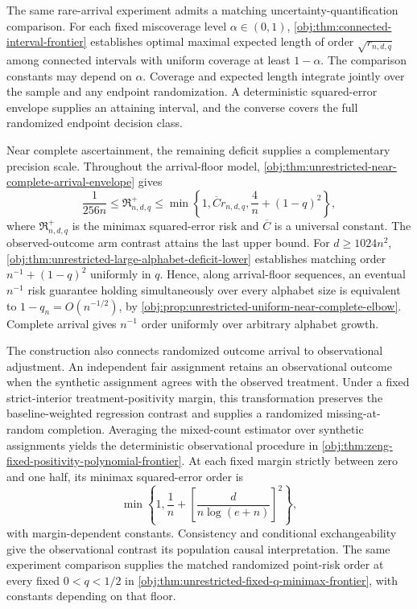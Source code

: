 The same rare-arrival experiment admits a matching uncertainty-quantification comparison. For each fixed miscoverage level \(\alpha\in(0,1)\), \cref{obj:thm:connected-interval-frontier} establishes optimal maximal expected length of order \(\sqrt{r_{n,d,q}}\) among connected intervals with uniform coverage at least \(1-\alpha\). The comparison constants may depend on \(\alpha\). Coverage and expected length integrate jointly over the sample and any endpoint randomization. A deterministic squared-error envelope supplies an attaining interval, and the converse covers the full randomized endpoint decision class.

Near complete ascertainment, the remaining deficit supplies a complementary precision scale. Throughout the arrival-floor model, \cref{obj:thm:unrestricted-near-complete-arrival-envelope} gives
\[
\frac{1}{256n}
\le \mathfrak R^{+}_{n,d,q}
\le
\min\left\{1,\overline C r_{n,d,q},
\frac4n+(1-q)^2\right\},
\]
where \(\mathfrak R^{+}_{n,d,q}\) is the minimax squared-error risk and \(\overline C\) is a universal constant. The observed-outcome arm contrast attains the last upper bound. For \(d\ge1024n^2\), \cref{obj:thm:unrestricted-large-alphabet-deficit-lower} establishes matching order \(n^{-1}+(1-q)^2\) uniformly in \(q\). Hence, along arrival-floor sequences, an eventual \(n^{-1}\) risk guarantee holding simultaneously over every alphabet size is equivalent to \(1-q_n=O(n^{-1/2})\), by \cref{obj:prop:unrestricted-uniform-near-complete-elbow}. Complete arrival gives \(n^{-1}\) order uniformly over arbitrary alphabet growth.

The construction also connects randomized outcome arrival to observational adjustment. An independent fair assignment retains an observational outcome when the synthetic assignment agrees with the observed treatment. Under a fixed strict-interior treatment-positivity margin, this transformation preserves the baseline-weighted regression contrast and supplies a randomized missing-at-random completion. Averaging the mixed-count estimator over synthetic assignments yields the deterministic observational procedure in \cref{obj:thm:zeng-fixed-positivity-polynomial-frontier}. At each fixed margin strictly between zero and one half, its minimax squared-error order is
\[
\min\left\{1,\frac1n+
\left[\frac{d}{n\log(e+n)}\right]^2\right\},
\]
with margin-dependent constants. Consistency and conditional exchangeability give the observational contrast its population causal interpretation. The same experiment comparison supplies the matched randomized point-risk order at every fixed \(0<q<1/2\) in \cref{obj:thm:unrestricted-fixed-q-minimax-frontier}, with constants depending on that floor.

